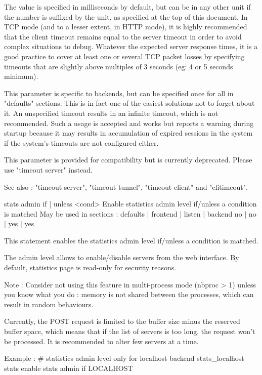   The value is specified in milliseconds by default, but can be in any other
  unit if the number is suffixed by the unit, as specified at the top of this
  document. In TCP mode (and to a lesser extent, in HTTP mode), it is highly
  recommended that the client timeout remains equal to the server timeout in
  order to avoid complex situations to debug. Whatever the expected server
  response times, it is a good practice to cover at least one or several TCP
  packet losses by specifying timeouts that are slightly above multiples of 3
  seconds (eg: 4 or 5 seconds minimum).

  This parameter is specific to backends, but can be specified once for all in
  "defaults" sections. This is in fact one of the easiest solutions not to
  forget about it. An unspecified timeout results in an infinite timeout, which
  is not recommended. Such a usage is accepted and works but reports a warning
  during startup because it may results in accumulation of expired sessions in
  the system if the system's timeouts are not configured either.

  This parameter is provided for compatibility but is currently deprecated.
  Please use "timeout server" instead.

  See also : "timeout server", "timeout tunnel", "timeout client" and
             "clitimeout".


stats admin { if | unless } <cond>
  Enable statistics admin level if/unless a condition is matched
  May be used in sections :   defaults | frontend | listen | backend
                                 no    |    no    |   yes  |   yes

  This statement enables the statistics admin level if/unless a condition is
  matched.

  The admin level allows to enable/disable servers from the web interface. By
  default, statistics page is read-only for security reasons.

  Note : Consider not using this feature in multi-process mode (nbproc > 1)
         unless you know what you do : memory is not shared between the
         processes, which can result in random behaviours.

  Currently, the POST request is limited to the buffer size minus the reserved
  buffer space, which means that if the list of servers is too long, the
  request won't be processed. It is recommended to alter few servers at a
  time.

  Example :
    # statistics admin level only for localhost
    backend stats_localhost
        stats enable
        stats admin if LOCALHOST

